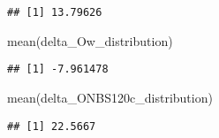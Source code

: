 \documentclass[
]{article}
\newenvironment{Shaded}{\begin{snugshade}}{\end{snugshade}}
\newcommand{\FunctionTok}[1]{\textcolor[rgb]{0.00,0.00,0.00}{#1}}
\newcommand{\NormalTok}[1]{#1}
\begin{document}
\begin{verbatim}
## [1] 13.79626
\end{verbatim}

\begin{Shaded}
\begin{Highlighting}[]
\FunctionTok{mean}\NormalTok{(delta\_Ow\_distribution)}
\end{Highlighting}
\end{Shaded}

\begin{verbatim}
## [1] -7.961478
\end{verbatim}

\begin{Shaded}
\begin{Highlighting}[]
\FunctionTok{mean}\NormalTok{(delta\_ONBS120c\_distribution)}
\end{Highlighting}
\end{Shaded}

\begin{verbatim}
## [1] 22.5667
\end{verbatim}
\end{document}
